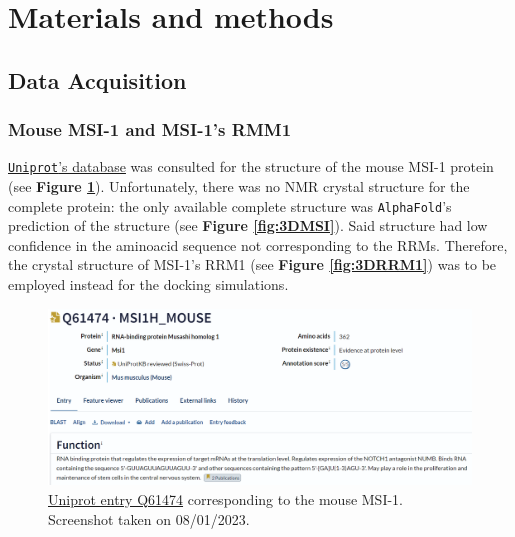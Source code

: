 \section{Materials and methods}

 
 

\subsection{Data Acquisition}

\subsubsection{Mouse MSI-1 and MSI-1's RMM1}

\href{https://www.uniprot.org/}{\texttt{Uniprot}'s database} was consulted for the structure of the mouse MSI-1 protein (see \textbf{Figure \ref{fig:Q61474uniprot}}). Unfortunately, there was no NMR crystal structure for the complete protein: the only available complete structure was \texttt{AlphaFold}'s prediction of the structure (see \textbf{Figure \ref{fig:3DMSI}}). Said structure had low confidence in the aminoacid sequence not corresponding to the RRMs. Therefore, the crystal structure of MSI-1's RRM1 (see \textbf{Figure \ref{fig:3DRRM1}}) was to be employed instead for the docking simulations.

\begin{figure}[htbp!]
    \centering
    \includegraphics[width=\linewidth]{assets/Q61474_uniprot_entry.png}
    \caption{\href{https://www.uniprot.org/uniprotkb/Q61474/entry}{Uniprot entry Q61474} corresponding to the mouse MSI-1. Screenshot taken on 08/01/2023.}
    \label{fig:Q61474uniprot}
\end{figure}

